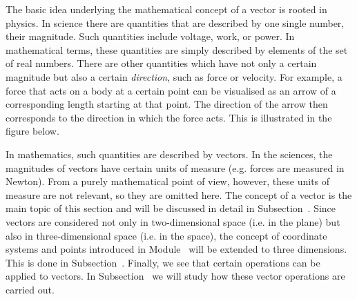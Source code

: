 
\Mtikzexternalize




\begin{MSectionStart}

\MModstartBox
\end{MSectionStart}


\begin{MIntro}

The basic idea underlying the mathematical concept of a vector is rooted in physics. In science there are quantities
that are described by one single number, their magnitude. Such quantities include voltage, work, 
or power. In mathematical terms, these quantities are simply described by elements of the set of real numbers. 
There are other quantities which have not only a certain magnitude but also a certain \textit{direction}, 
such as force or velocity. For example, a force that acts on a body at a certain point can be visualised as 
an arrow of a corresponding length starting at that point. The direction of the arrow then corresponds to the direction 
in which the force acts. This is illustrated in the figure below.

\begin{center}
%
\end{center}

In mathematics, such quantities are described by vectors. In the sciences, the magnitudes of vectors have certain 
units of measure (e.g. forces are measured in Newton). From a purely mathematical point of view, however, these units of 
measure are not relevant, so they are omitted here. The concept of a vector is the main topic of 
this section and will be discussed in detail in Subsection~. Since vectors are considered not only 
in two-dimensional space (i.e. in the plane) but also in three-dimensional space (i.e. in the space), the concept 
of coordinate systems and points introduced in Module~ will be extended to three dimensions.
This is done in Subsection~. Finally, we see that certain operations can be applied
to vectors. In Subsection~ we will study how these vector operations are carried out. 
\end{MIntro}

